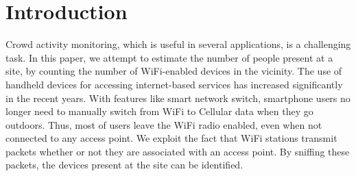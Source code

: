 \section{Introduction}

Crowd activity monitoring, which is useful in several applications, is a challenging task. In this paper, we attempt to estimate the number of people present at a site, by counting the number of WiFi-enabled devices in the vicinity. The use of handheld devices for accessing internet-based services has increased significantly in the recent years. With features like smart network switch, smartphone users no longer need to manually switch from WiFi to Cellular data when they go outdoors. Thus, most of users leave the WiFi radio enabled, even when not connected to any access point. We exploit the fact that WiFi stations transmit packets whether or not they are associated with an access point. By sniffing these packets, the devices present at the site can be identified.

